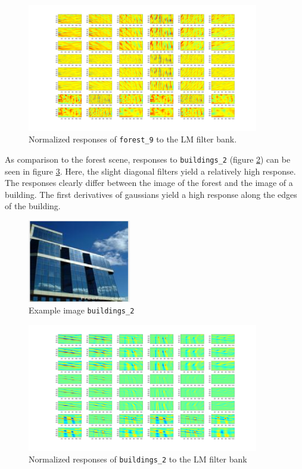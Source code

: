 \begin{figure}[!hbt]
  \centering
  \includegraphics[width=0.9\textwidth]{img/f9_responses_normalized}
  \caption{Normalized responses of \texttt{forest\_9} to the LM filter bank.}
  \label{fig:f9ResponseC}
\end{figure}



As comparison to the forest scene, responses to \texttt{buildings\_2} (figure \ref{fig:b2ResponseA}) can be seen in figure \ref{fig:b2ResponseB}. Here, the slight diagonal filters yield a relatively high response. The responses clearly differ between the image of the forest and the image of a building. The first derivatives of gaussians yield a high response along the edges of the building. 

\begin{figure}[!hbt]
  \centering
  \includegraphics[width=0.4\textwidth]{img/b2}
  \caption{Example image \texttt{buildings\_2}}
  \label{fig:b2ResponseA}
\end{figure}

\begin{figure}[!hbt]
  \centering
  \includegraphics[width=0.9\textwidth]{img/b2_responses_normalized}
  \caption{Normalized responses of \texttt{buildings\_2} to the LM filter bank}
  \label{fig:b2ResponseB}
\end{figure}

